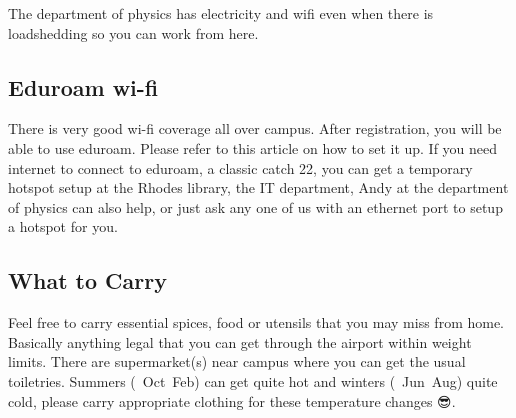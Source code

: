 The department of physics has electricity and wifi even when there is loadshedding so you can work from here.

\subsection{Eduroam wi-fi}
There is very good wi-fi coverage all over campus. After registration, you will be able to use eduroam. Please refer to this article on how to set it up. If you need internet to connect to eduroam, a classic catch 22, you can get a temporary hotspot setup at the Rhodes library, the IT department, Andy at the department of physics can also help, or just ask any one of us with an ethernet port to setup a hotspot for you.

\subsection{What to Carry}
Feel free to carry essential spices, food or utensils that you may miss from home. Basically anything legal that you can get through the airport within weight limits. There are supermarket(s) near campus where you can get the usual toiletries. 
Summers (~Oct~Feb) can get quite hot and winters (~Jun~Aug) quite cold, please carry appropriate clothing for these temperature changes 😎.
